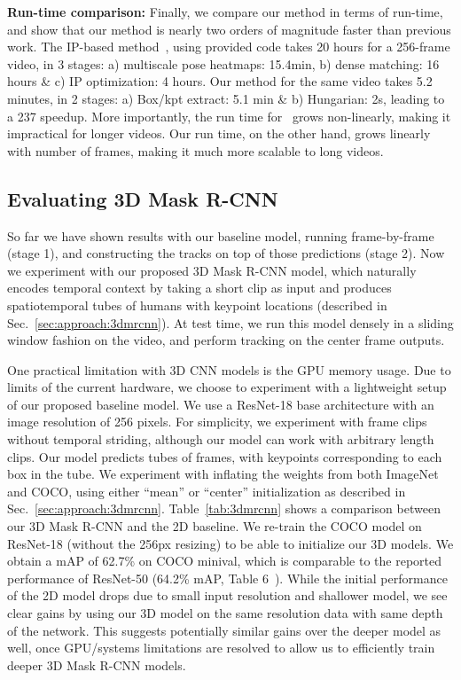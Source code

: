 \documentclass[10pt,twocolumn,letterpaper]{article}
\newcommand{\MODEL}[0]{3D Mask R-CNN}
\begin{document}
{\noindent \bf Run-time comparison:}\label{sec:expts:runtime}
Finally, we compare our method in terms of run-time, and show that our
method is nearly two orders of magnitude faster than previous work.
The IP-based method~\cite{iqbal2016pose},
using provided code 
takes 20 hours for a 256-frame video, in 3 stages: a) multiscale pose heatmaps:  15.4min, b) dense matching: 16 hours \& c) IP optimization: 4 hours.
Our method for the same video takes 5.2 minutes, in 2 stages: a) Box/kpt extract: 5.1 min \& b) Hungarian: 2s, leading to a
237 speedup.
More importantly, 
the run time for~\cite{iqbal2016pose} grows non-linearly,
making it impractical for longer videos.
Our run time, on the other hand, grows linearly with number of frames, 
making it much more scalable to long videos.



\subsection{Evaluating \MODEL{}}\label{sec:exp:3dmrcnn}




So far we have shown results with our baseline model, running frame-by-frame (stage 1),
and constructing the tracks on top of those predictions (stage 2). Now we experiment with our proposed \MODEL{} model, which naturally encodes temporal context by
taking a short clip as input and produces spatiotemporal tubes of humans with keypoint locations (described
in Sec.~\ref{sec:approach:3dmrcnn}). At test time, we run this model densely in a sliding window fashion
on the video, and perform tracking on the center frame outputs.

One practical limitation with 3D CNN models is the GPU memory usage. Due to limits of the current
hardware, we choose to experiment with a lightweight setup of our proposed baseline model.
We use a ResNet-18 base architecture with an image resolution of 256 pixels.
For simplicity, we experiment with  frame clips without temporal
striding, although our model can work with arbitrary length clips.
Our model predicts tubes of  frames, with keypoints corresponding to each box in the tube.
We experiment with inflating the weights from both ImageNet and COCO, using
either ``mean'' or ``center'' initialization as described in Sec.~\ref{sec:approach:3dmrcnn}.
Table~\ref{tab:3dmrcnn} shows a comparison between our 3D Mask R-CNN and the  2D baseline.
We re-train the COCO model on ResNet-18 (without the 256px resizing) to be able to initialize our 3D models.
We obtain a mAP of 62.7\% on COCO minival, which is comparable
to the reported performance of ResNet-50 (64.2\% mAP, Table 6~\cite{he2017mask}).
While the initial performance of the 2D model drops due to small input resolution and shallower model, we see clear gains by using our 3D model on the same
resolution data with same depth of the network. This suggests potentially similar gains over the deeper model as well, once GPU/systems limitations
are resolved to allow us to efficiently train deeper \MODEL{} models.
\end{document}
